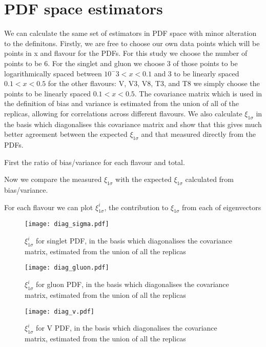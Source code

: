 \section{PDF space estimators}

We can calculate the same set of estimators in PDF space with minor alteration
to the definitons. Firstly, we are free to choose our own data points which will
be points in x and flavour for the PDFs. For this study we choose the number
of points to be 6. For the singlet and gluon we choose 3 of those points to be
logarithmically spaced between $10^-3<x<0.1$ and 3 to be linearly spaced $0.1<x<0.5$
for the other flavours:  V, V3, V8, T3, and T8 we simply choose the points to be
linearly spaced $0.1<x<0.5$. The covariance matrix which is used in the definition
of bias and variance is estimated from the union of all of the replicas, allowing
for correlations across different flavours. We also calculate $\xi_{1\sigma}$
in the basis which diagonalises this covariance matrix and show that this gives
much better agreement between the expected $\xi_{1\sigma}$ and that measured
directly from the PDFs.

First the ratio of bias/variance for each flavour and total.



Now we compare the measured $\xi_{1\sigma}$ with the expected $\xi_{1\sigma}$
calculated from bias/variance.



For each flavour we can plot $\xi^{i}_{1\sigma}$, the contribution to $\xi_{1\sigma}$
from each of eigenvectors

\begin{figure}
    \centering
    \texttt{[image: diag\_sigma.pdf]}
    \caption{
        $\xi^{i}_{1\sigma}$ for singlet PDF, in the basis which diagonalises
        the covariance matrix, estimated from the union of all the replicas
    }
    \label{fig:pdfdiagsinglet}
\end{figure}

\begin{figure}
    \centering
    \texttt{[image: diag\_gluon.pdf]}
    \caption{
        $\xi^{i}_{1\sigma}$ for gluon PDF, in the basis which diagonalises
        the covariance matrix, estimated from the union of all the replicas
    }
    \label{fig:pdfdiaggluon}
\end{figure}

\begin{figure}
    \centering
    \texttt{[image: diag\_v.pdf]}
    \caption{
        $\xi^{i}_{1\sigma}$ for V PDF, in the basis which diagonalises
        the covariance matrix, estimated from the union of all the replicas
    }
    \label{fig:pdfdiagv}
\end{figure}

